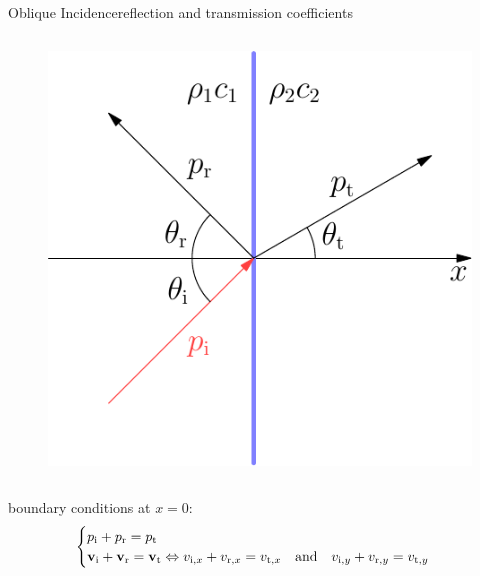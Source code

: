 \documentclass[9pt,mathserif]{beamer}
\begin{document}
\begin{frame}{Oblique Incidence}{reflection and transmission coefficients}
\begin{columns}
\begin{figure}
			\includegraphics[width=\textwidth]{img/idealfluid/planeObliqueIncidence.pdf}
		\end{figure}
	\end{columns}

	\begin{outline}
		\1 boundary conditions at $x=0$:
		$$\begin{cases} p\st{i} +p\st{r} = p\st{t} \\
			\vb{v}\st{i} +\vb{v} \st{r} =\vb{v}\st{t} \Leftrightarrow
			v_{\text{i}, x} + v_{\text{r}, x} = v_{\text{t}, x} \qand
			v_{\text{i}, y} + v_{\text{r}, y} = v_{\text{t}, y}
		\end{cases}
			$$
	\end{outline}
\end{frame}
\end{document}
